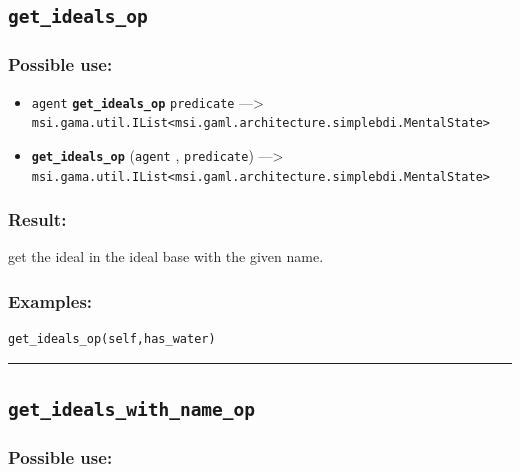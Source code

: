 \documentclass[]{book}
\providecommand{\tightlist}{%
  \setlength{\itemsep}{0pt}\setlength{\parskip}{0pt}}
\theoremstyle{definition}
\theoremstyle{definition}
\theoremstyle{definition}
\theoremstyle{remark}
\begin{document}
\subsection{\texorpdfstring{\texttt{get\_ideals\_op}}{get\_ideals\_op}}\label{get_ideals_op}

\subsubsection{Possible use:}\label{possible-use-211}

\begin{itemize}
\tightlist
\item
  \texttt{agent} \textbf{\texttt{get\_ideals\_op}} \texttt{predicate}
  ---\textgreater{}
  \texttt{msi.gama.util.IList\textless{}msi.gaml.architecture.simplebdi.MentalState\textgreater{}}
\item
  \textbf{\texttt{get\_ideals\_op}} (\texttt{agent} ,
  \texttt{predicate}) ---\textgreater{}
  \texttt{msi.gama.util.IList\textless{}msi.gaml.architecture.simplebdi.MentalState\textgreater{}}
\end{itemize}

\subsubsection{Result:}\label{result-205}

get the ideal in the ideal base with the given name.

\subsubsection{Examples:}\label{examples-158}

\begin{verbatim}
get_ideals_op(self,has_water) 
\end{verbatim}

\begin{center}\rule{0.5\linewidth}{\linethickness}\end{center}

\subsection{\texorpdfstring{\texttt{get\_ideals\_with\_name\_op}}{get\_ideals\_with\_name\_op}}\label{get_ideals_with_name_op}

\subsubsection{Possible use:}\label{possible-use-212}
\end{document}
